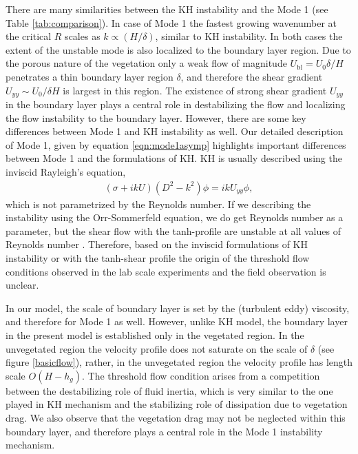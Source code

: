 \documentclass[12pt]{report}   %
\newcommand{\Rey}{{R}}
\newcommand{\ubl}{U_\text{bl}}
\begin{document}
There are many similarities between the KH instability and the Mode 1 (see Table \ref{tab:comparison}). 
In case of Mode 1 the fastest growing wavenumber at the critical $\Rey$ scales as $k \propto (H/\delta)$, similar to KH instability. 
In both cases the extent of the unstable mode is also localized to the boundary layer region.
Due to the porous nature of the vegetation only a weak flow of magnitude $\ubl = U_0 \delta/H$ penetrates a thin boundary layer region $\delta$, and therefore the shear gradient $U_{yy} \sim U_0/\delta H$ is largest in this region.
The existence of strong shear gradient $U_{yy}$ in the boundary layer plays a central role in destabilizing the flow and localizing the flow instability to the boundary layer. However, there are some key differences between Mode 1 and KH instability as well. 
Our detailed description of Mode 1, given by equation \eqref{eqn:mode1asymp} highlights important differences between Mode 1 and the formulations of KH. 
KH is usually described using the inviscid Rayleigh's equation, 
\begin{align}
\left(\sigma+ikU\right) \left(D^2-k^2\right)\phi =  ikU_{yy}\phi, 
\label{eqn:Rayleigh}
\end{align}
which is not parametrized by the Reynolds number. If we describing the instability using the Orr-Sommerfeld equation, we do get Reynolds number as a parameter, but the shear flow with the tanh-profile are unstable at all values of Reynolds number \cite{Drazin81}. Therefore, based on the inviscid formulations of KH instability or with the tanh-shear profile the origin of the threshold flow conditions observed in the lab scale experiments and the field observation is unclear.

In our model, the scale of boundary layer is set by the (turbulent eddy) viscosity, and therefore for Mode 1 as well.
However, unlike KH model, the boundary layer in the present model is established only in the vegetated region. In the unvegetated region the velocity profile does not saturate on the scale of $\delta$ (see figure \ref{basicflow}), rather, in the unvegetated region the velocity profile has length scale $O(H-h_g)$. The threshold flow condition arises from a competition between the destabilizing role of fluid inertia, which is very similar to the one played in KH mechanism and the stabilizing role of dissipation due to vegetation drag. We also observe that the vegetation drag may not be neglected within this boundary layer, and therefore plays a central role in the Mode 1 instability mechanism.
\end{document}
